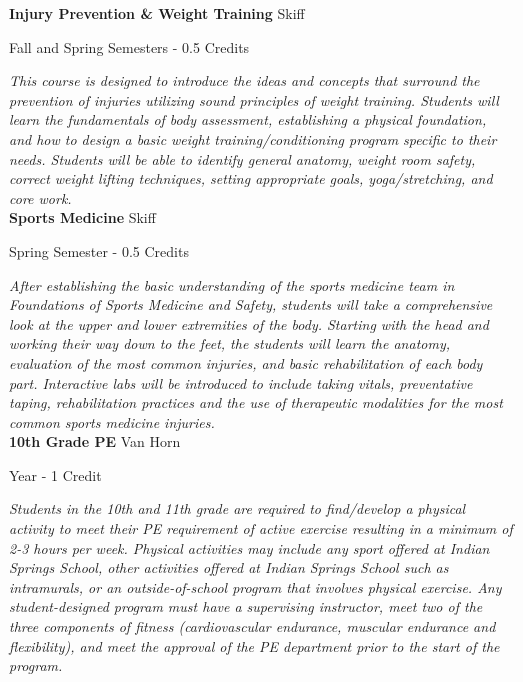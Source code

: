 \noindent\textbf{Injury Prevention \& Weight Training} \hfill Skiff

\noindent Fall and Spring Semesters - 0.5 Credits

\vspace{1mm}\emph{This course is designed to introduce the ideas and concepts that surround the prevention of injuries utilizing sound principles of weight training.  Students will learn the fundamentals of body assessment, establishing a physical foundation, and how to design a basic weight training/conditioning program specific to their needs.  Students will be able to identify general anatomy, weight room safety, correct weight lifting techniques, setting appropriate goals, yoga/stretching, and core work.}\\

\noindent\textbf{Sports Medicine} \hfill Skiff

\noindent Spring Semester - 0.5 Credits

\vspace{1mm}\emph{After establishing the basic understanding of the sports medicine team in Foundations of Sports Medicine and Safety, students will take a comprehensive look at the upper and lower extremities of the body.  Starting with the head and working their way down to the feet, the students will learn the anatomy, evaluation of the most common injuries, and basic rehabilitation of each body part.  Interactive labs will be introduced to include taking vitals, preventative taping, rehabilitation practices and the use of therapeutic modalities for the most common sports medicine injuries.}\\

\noindent\textbf{10th Grade PE} \hfill Van Horn

\noindent Year - 1 Credit

\vspace{1mm}\emph{Students in the 10th and 11th grade are required to find/develop a physical activity to meet their PE requirement of active exercise resulting in a minimum of 2-3 hours per week.  Physical activities may include any sport offered at Indian Springs School, other activities offered at Indian Springs School such as intramurals, or an outside-of-school program that involves physical exercise.  Any student-designed program must have a supervising instructor, meet two of the three components of fitness (cardiovascular endurance, muscular endurance and flexibility), and meet the approval of the PE department prior to the start of the program.}\\

